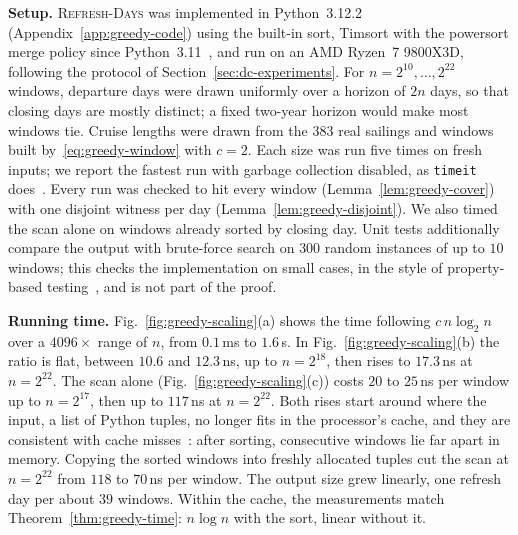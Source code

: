 \textbf{Setup.} \textsc{Refresh-Days} was implemented in Python~3.12.2
(Appendix~\ref{app:greedy-code}) using the built-in sort, Timsort with the
powersort merge policy since Python~3.11~\cite{munro2018nearly}, and run on an AMD
Ryzen~7 9800X3D, following the protocol of Section~\ref{sec:dc-experiments}.
For $n=2^{10},\dots,2^{22}$ windows, departure days were drawn uniformly over
a horizon of $2n$ days, so that closing days are mostly distinct; a fixed
two-year horizon would make most windows tie. Cruise lengths were drawn from
the $383$ real sailings and windows built by~\eqref{eq:greedy-window} with
$c=2$. Each size was run five times on fresh inputs; we report the fastest
run with garbage collection disabled, as \texttt{timeit}
does~\cite{python-timeit}. Every run was checked to hit every window
(Lemma~\ref{lem:greedy-cover}) with one disjoint witness per day
(Lemma~\ref{lem:greedy-disjoint}). We also timed the scan alone on windows
already sorted by closing day. Unit tests additionally compare the output
with brute-force search on $300$ random instances of up to $10$ windows; this
checks the implementation on small cases, in the style of property-based
testing~\cite{claessen2000quickcheck}, and is not part of the proof.

\textbf{Running time.} Fig.~\ref{fig:greedy-scaling}(a) shows the time
following $c\,n\log_2 n$ over a $4096\times$ range of $n$, from
$0.1$\,ms to $1.6$\,s. In Fig.~\ref{fig:greedy-scaling}(b) the ratio is flat,
between $10.6$ and $12.3$\,ns, up to $n=2^{18}$, then rises to $17.3$\,ns at
$n=2^{22}$. The scan alone (Fig.~\ref{fig:greedy-scaling}(c)) costs
$20$ to $25$\,ns per window up to $n=2^{17}$, then up to $117$\,ns at
$n=2^{22}$. Both rises start around where the input, a list of Python tuples, no
longer fits in the processor's cache, and they are consistent with cache
misses~\cite{drepper2007memory}: after sorting, consecutive windows lie far apart in memory. Copying
the sorted windows into freshly allocated tuples cut the scan at $n=2^{22}$
from $118$ to $70$\,ns per window. The output size grew linearly, one refresh
day per about $39$ windows. Within the cache, the measurements match
Theorem~\ref{thm:greedy-time}: $n\log n$ with the sort, linear without it.
